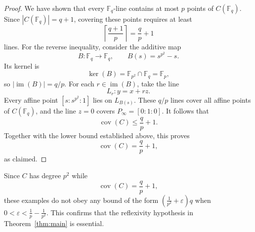 \documentclass[12pt,reqno]{amsart}
\theoremstyle{definition}
\theoremstyle{remark}
\newcommand{\bF}{\mathbb{F}}
\newcommand{\Fp}{\mathbb{F}_p}
\newcommand{\Fq}{\mathbb{F}_q}
\begin{document}
\begin{proof}
We have shown that every $\Fq$-line contains at most $p$ points of $C(\Fq)$. Since $|C(\Fq)|=q+1$, covering these points requires at least
\[
\left\lceil\frac{q+1}{p}\right\rceil = \frac{q}{p}+1
\]
lines. For the reverse inequality, consider the additive map
\[
B\colon\Fq\longrightarrow\Fq,
\qquad B(s)=s^{p^2}-s.
\]
Its kernel is
\[
\ker(B) = \bF_{p^2}\cap\Fq = \Fp,
\]
so $|\operatorname{im}(B)|=q/p$. For each $r\in\operatorname{im}(B)$, take the line
\[
L_r\colon y=x+rz.
\]
Every affine point $[s:s^{p^2}:1]$ lies on $L_{B(s)}$. These $q/p$ lines cover all affine points of $C(\Fq)$, and the line $z=0$ covers $P_\infty=[0:1:0]$. It follows that
\[
\operatorname{cov}(C)\leq\frac{q}{p}+1.
\]
Together with the lower bound established above, this proves
\[
\operatorname{cov}(C)=\frac{q}{p}+1,
\]
as claimed. \end{proof}

Since $C$ has degree $p^2$ while
\[
\operatorname{cov}(C)=\frac{q}{p}+1,
\]
these examples do not obey any bound of the form
$\left(\frac{1}{p^2}+\varepsilon\right)q$ when
$0<\varepsilon<\frac{1}{p}-\frac{1}{p^2}$. This confirms that the reflexivity hypothesis in Theorem~\ref{thm:main} is essential.
\end{document}
